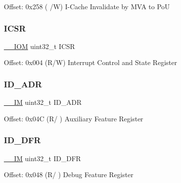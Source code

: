 Offset\+: 0x258 ( /W) I-\/\+Cache Invalidate by M\+VA to PoU \mbox{\label{struct_s_c_b___type_aced895d6aba03d72b0d865fcc5ce44ee}} 
\subsubsection{\texorpdfstring{I\+C\+SR}{ICSR}}
{\footnotesize\ttfamily \mbox{\hyperlink{core__cm4_8h_ab6caba5853a60a17e8e04499b52bf691}{\+\_\+\+\_\+\+I\+OM}} uint32\+\_\+t I\+C\+SR}

Offset\+: 0x004 (R/W) Interrupt Control and State Register \mbox{\label{struct_s_c_b___type_a394a63fd0c3f9d7a52d7b220e31a2ef4}} 
\subsubsection{\texorpdfstring{I\+D\+\_\+\+A\+DR}{ID\_ADR}}
{\footnotesize\ttfamily \mbox{\hyperlink{core__cm4_8h_a4cc1649793116d7c2d8afce7a4ffce43}{\+\_\+\+\_\+\+IM}} uint32\+\_\+t I\+D\+\_\+\+A\+DR}

Offset\+: 0x04C (R/ ) Auxiliary Feature Register \mbox{\label{struct_s_c_b___type_a883f7e28417c51d3a3bf03185baf448f}} 
\subsubsection{\texorpdfstring{I\+D\+\_\+\+D\+FR}{ID\_DFR}}
{\footnotesize\ttfamily \mbox{\hyperlink{core__cm4_8h_a4cc1649793116d7c2d8afce7a4ffce43}{\+\_\+\+\_\+\+IM}} uint32\+\_\+t I\+D\+\_\+\+D\+FR}

Offset\+: 0x048 (R/ ) Debug Feature Register \mbox{\label{struct_s_c_b___type_a7b10a73ce177ee4ea65cf88f8538017e}} 
